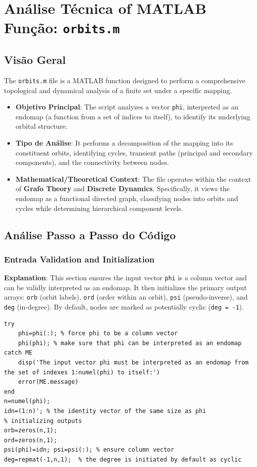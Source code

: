 
\chapter{Análise Técnica of MATLAB Função: \texttt{orbits.m}}
\section{Visão Geral}

The \texttt{orbits.m} file is a MATLAB function designed to perform a comprehensive topological and dynamical analysis of a finite set under a specific mapping.

\begin{itemize}
    \item \textbf{Objetivo Principal}: The script analyzes a vector \texttt{phi}, interpreted as an endomap (a function from a set of indices to itself), to identify its underlying orbital structure.
    \item \textbf{Tipo de Análise}: It performs a decomposition of the mapping into its constituent orbits, identifying cycles, transient paths (principal and secondary components), and the connectivity between nodes.
    \item \textbf{Mathematical/Theoretical Context}: The file operates within the context of \textbf{Grafo Theory} and \textbf{Discrete Dynamics}. Specifically, it views the endomap as a functional directed graph, classifying nodes into orbits and cycles while determining hierarchical component levels.
\end{itemize}



\section{Análise Passo a Passo do Código}

\subsection{Entrada Validation and Initialization}
\textbf{Explanation}: This section ensures the input vector \texttt{phi} is a column vector and can be validly interpreted as an endomap. It then initializes the primary output arrays: \texttt{orb} (orbit labels), \texttt{ord} (order within an orbit), \texttt{psi} (pseudo-inverse), and \texttt{deg} (in-degree). By default, nodes are marked as potentially cyclic (\texttt{deg = -1}).

\begin{lstlisting}
try
    phi=phi(:); % force phi to be a column vector
    phi(phi); % make sure that phi can be interpreted as an endomap
catch ME
    disp('The input vector phi must be interpreted as an endomap from the set of indexes 1:numel(phi) to itself:')
    error(ME.message)
end
n=numel(phi);
idn=(1:n)'; % the identity vector of the same size as phi
% initializing outputs
orb=zeros(n,1);
ord=zeros(n,1);
psi(phi)=idn; psi=psi(:); % ensure column vector
deg=repmat(-1,n,1);  % the degree is initiated by default as cyclic
\end{lstlisting}

